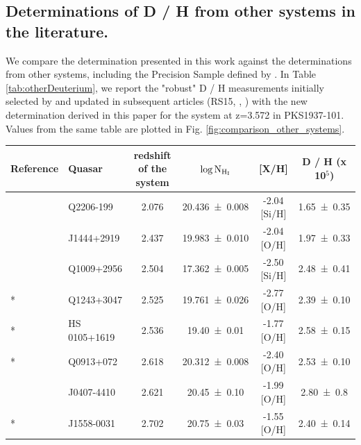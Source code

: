 \documentclass[fleqn,usenatbib]{mnras}
\makeatletter
\DeclareRobustCommand{\ion}[2]{%
  \mbox{#1\check@mathfonts\fontsize\sf@size\z@\selectfont #2}%
}
\makeatother
\begin{document}
\subsection{Determinations of \texorpdfstring{\ion{D}{}/\ion{H}{}}{} from other systems in the literature.}
We compare the determination presented in this work against the determinations from other systems, including the Precision Sample defined by \citet{cooke_18}. 
In Table \ref{tab:otherDeuterium}, we report the "robust" \ion{D}{}/\ion{H}{} measurements initially selected by \citet{pettini_2008} and updated in subsequent articles (RS15, , \citet{zavarygin_18}) with the new determination derived in this paper for the system at z=3.572 in PKS1937-101. Values from the same table are plotted in Fig. \ref{fig:comparison_other_systems}.

\begin{table}
    \centering
    \begin{tabular}{l|l|c|c|c|c}
        \toprule
         Reference & Quasar & redshift of the system & $\log{\rm N_{H_I}}$ & [X/H] & \ion{D}{}/\ion{H}{} (x 10$^5$) \\
         \midrule
         \citet{pettini_2001}           & Q2206-199       & 2.076  & \num{20.436 \pm 0.008}   & -2.04 [Si/H]   & \num{1.65 \pm 0.35} \\
         \citet{balashev_2016}          & J1444+2919      & 2.437  & \num{19.983 \pm 0.010}   & -2.04 [O/H]    & \num{1.97 \pm 0.33} \\
         \citet{zavarygin_18}           & Q1009+2956      & 2.504  & \num{17.362 \pm 0.005}   & -2.50 [Si/H]   & \num{2.48 \pm 0.41} \\
         \citet{cooke_18}*              & Q1243+3047      & 2.525  & \num{19.761 \pm 0.026}   & -2.77 [O/H]    & \num{2.39 \pm 0.10} \\
         \citet{omeara_2001}*           & HS 0105+1619    & 2.536  & \num{19.40  \pm 0.01}    & -1.77 [O/H]    & \num{2.58 \pm 0.15} \\
         \citet{pettini_2008}*          & Q0913+072       & 2.618  & \num{20.312 \pm 0.008}   & -2.40 [O/H]    & \num{2.53 \pm 0.10} \\
         \citet{noterdaeme_2012}        & J0407-4410      & 2.621  & \num{20.45  \pm 0.10}    & -1.99 [O/H]    & \num{2.80 \pm 0.8} \\
         \citet{omeara_2006}*           & J1558-0031      & 2.702  & \num{20.75  \pm 0.03}    & -1.55 [O/H]    & \num{2.40 \pm 0.14} \\

\end{tabular}
\end{table}
\end{document}
